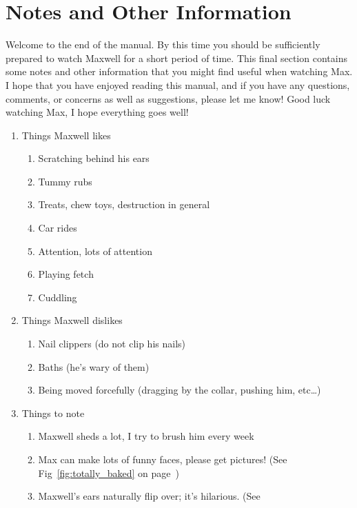 \documentclass[pdftex,12pt]{article}
\begin{document}
\newpage
\section{Notes and Other Information}

Welcome to the end of the manual. By this time you should be sufficiently
prepared to watch Maxwell for a short period of time. This final section
contains some notes and other information that you might find useful when
watching Max. I hope that you have enjoyed reading this manual, and if you have
any questions, comments, or concerns as well as suggestions, please let me know!
Good luck watching Max, I hope everything goes well!

\bigskip

\begin{enumerate}\label{itm:other_information}
    \item Things Maxwell likes
        \begin{enumerate}
            \item Scratching behind his ears
            \item Tummy rubs
            \item Treats, chew toys, destruction in general
            \item Car rides
            \item Attention, lots of attention
            \item Playing fetch
            \item Cuddling
        \end{enumerate}
    \item Things Maxwell dislikes
        \begin{enumerate}
            \item Nail clippers (do not clip his nails)
            \item Baths (he's wary of them)
            \item Being moved forcefully (dragging by the collar, pushing him,
                etc\ldots)
        \end{enumerate}
    \item Things to note
        \begin{enumerate}
            \item Maxwell sheds a lot, I try to brush him every week
            \item Max can make lots of funny faces, please get pictures! (See
                Fig~\ref{fig:totally_baked} on page~\pageref{fig:totally_baked})
            \item Maxwell's ears naturally flip over; it's hilarious. (See

\end{enumerate}
\end{enumerate}
\end{document}

